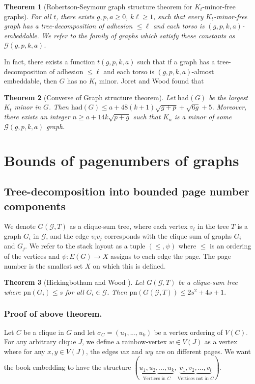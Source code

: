 \documentclass[]{report}
\newcommand{\had}{\text{had}}
\newcommand{\pn}{\text{pn}}
\newtheorem{theorem}{Theorem}
\theoremstyle{definition}
\numberwithin{theorem}{section}
\numberwithin{equation}{section}
\begin{document}
\begin{theorem}[Robertson-Seymour graph structure theorem for $K_t$-minor-free graphs]
	For all $t$, there exists $g, p, a \geq 0$, $k \ell \geq 1$, such that every $K_t$-minor-free graph has a tree-decomposition of adhesion $\leq \ell$ and each torso is $(g, p, k, a)$-embeddable. We refer to the family of graphs which satisfy these constants as $\mathcal{G}(g, p, k, a)$. 
\end{theorem}
In fact, there exists a function $t(g, p, k, a)$ such that if a graph has a tree-decomposition of adhesion $\leq \ell$ and each torso is $(g, p, k, a)$-almost embeddable, then $G$ has no $K_t$ minor. Joret and Wood\cite{joretCompleteGraphMinors2013} found that
\begin{theorem}[Converse of Graph structure theorem\cite{joretCompleteGraphMinors2013}]\label{thm:graph_structure_bound_theorem}
	Let $\had(G)$ be the largest $K_t$ minor in $G$. Then 
	 $\had(G) \leq a + 48(k + 1)\sqrt{g + p} + \sqrt{6g} + 5$. Moreover, there exists an integer $n \geq a + 1 4 k\sqrt{p + g}$ such that $K_n$ is a minor of some $\mathcal{G}(g, p, k, a)$ graph.
\end{theorem}


\section{Bounds of pagenumbers of graphs}\label{sec:BoundedPagenumber} 
\subsection{Tree-decomposition into bounded page number components}\label{ssec:Clique_sum_Pagenumber_bound}
We denote $G(\mathcal{G}, T)$ as a clique-sum tree, where each vertex $v_i$ in the tree $T$ is a graph $G_i$ in $\mathcal{G}$, and the edge $v_iv_j$ corresponds with the clique sum of graphs $G_i$ and $G_j$. We refer to the stack layout as a tuple $(\leq , \psi)$ where $\leq$ is an ordering of the vertices and $\psi : E(G) \rightarrow X$ assigns to each edge the page. The page number is the smallest set $X$ on which this is defined. 
\begin{theorem}[Hickingbotham and Wood \cite{hickingbothamStackNumberCliqueSum2023}]\label{thm:clique_sum_pagenumber_bound}
	Let $G(\mathcal{G}, T)$ be a clique-sum tree where $\pn(G_i) \leq s$ for all $G_i \in \mathcal{G}$. Then $\pn(G(\mathcal{G}, T)) \leq 2s^2 + 4s + 1$.  
\end{theorem}

\subsubsection{Proof of above theorem.}
Let $C$ be a clique in $G$ and let $\sigma_C = (u_1, ... , u_k)$ be a vertex ordering of $V(C)$. For any arbitrary clique $J$, we define a rainbow-vertex $w \in V(J)$ as a vertex where for any $x, y \in V(J)$, the edges $wx$ and $wy$ are on different pages. We want the book embedding to have the structure $(\underbrace{u_1, u_2, ..., u_k}_{\text{Vertices in } C}, \underbrace{v_1, v_2, ..., v_l}_{\text{Vertices not in }C})$.
\end{document}
